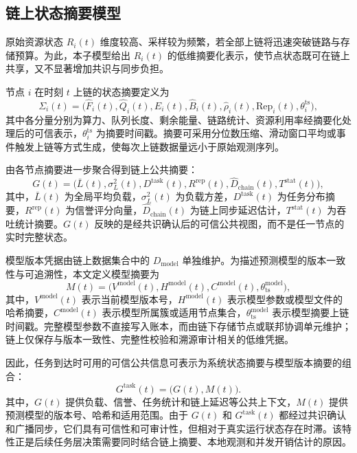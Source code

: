 \subsection{链上状态摘要模型}
\label{subsec:ch3_state_summary}

原始资源状态 $R_i(t)$ 维度较高、采样较为频繁，若全部上链将迅速突破链路与存储预算。为此，本子模型给出 $R_i(t)$ 的低维摘要化表示，使节点状态既可在链上共享，又不显著增加共识与同步负担。

节点 $i$ 在时刻 $t$ 上链的状态摘要定义为
\begin{equation}
    \Sigma_i(t)=\big(\hat{F}_i(t),\hat{Q}_i(t),\hat{E}_i(t),\hat{B}_i(t),\hat{\rho}_i(t),\mathrm{Rep}_i(t),\theta_i^{\mathrm{ts}}\big),
    \label{eq:ch3_state_summary}
\end{equation}
其中各分量分别为算力、队列长度、剩余能量、链路统计、资源利用率经摘要化处理后的可信表示，$\theta_i^{\mathrm{ts}}$ 为摘要时间戳。摘要可采用分位数压缩、滑动窗口平均或事件触发上链等方式生成，使每次上链数据量远小于原始观测序列。

由各节点摘要进一步聚合得到链上公共摘要：
\begin{equation}
    G(t)=\big(\bar{L}(t),\sigma_L^2(t),D^{\mathrm{task}}(t),R^{\mathrm{rep}}(t),\hat{D}_{\mathrm{chain}}(t),T^{\mathrm{stat}}(t)\big),
    \label{eq:ch3_public_summary_unified}
\end{equation}
其中，$\bar{L}(t)$ 为全局平均负载，$\sigma_L^2(t)$ 为负载方差，$D^{\mathrm{task}}(t)$ 为任务分布摘要，$R^{\mathrm{rep}}(t)$ 为信誉评分向量，$\hat{D}_{\mathrm{chain}}(t)$ 为链上同步延迟估计，$T^{\mathrm{stat}}(t)$ 为吞吐统计摘要。$G(t)$ 反映的是经共识确认后的可信公共视图，而不是任一节点的实时完整状态。

模型版本凭据由链上数据集合中的 $D_{\mathrm{model}}$ 单独维护。为描述预测模型的版本一致性与可追溯性，本文定义模型摘要为
\begin{equation}
    M(t)=\big(V^{\mathrm{model}}(t),H^{\mathrm{model}}(t),C^{\mathrm{model}}(t),\theta^{\mathrm{model}}_{\mathrm{ts}}\big),
    \label{eq:ch3_model_summary}
\end{equation}
其中，$V^{\mathrm{model}}(t)$ 表示当前模型版本号，$H^{\mathrm{model}}(t)$ 表示模型参数或模型文件的哈希摘要，$C^{\mathrm{model}}(t)$ 表示模型所属簇或适用节点集合，$\theta^{\mathrm{model}}_{\mathrm{ts}}$ 表示模型摘要上链时间戳。完整模型参数不直接写入账本，而由链下存储节点或联邦协调单元维护；链上仅保存与版本一致性、完整性校验和溯源审计相关的低维凭据。

因此，任务到达时可用的可信公共信息可表示为系统状态摘要与模型版本摘要的组合：
\begin{equation}
    G^{\mathrm{task}}(t)=\big(G(t),M(t)\big).
    \label{eq:ch3_task_public_summary}
\end{equation}
其中，$G(t)$ 提供负载、信誉、任务统计和链上延迟等公共上下文，$M(t)$ 提供预测模型的版本号、哈希和适用范围。由于 $G(t)$ 和 $G^{\mathrm{task}}(t)$ 都经过共识确认和广播同步，它们具有可信性和可审计性，但相对于真实运行状态存在时滞。该特性正是后续任务层决策需要同时结合链上摘要、本地观测和并发开销估计的原因。

